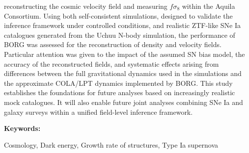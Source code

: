 reconstructing the cosmic velocity field and measuring $f\sigma_8$ within the Aquila Consortium. Using both self-consistent simulations, designed to validate the inference framework 
under controlled conditions, and realistic ZTF-like SNe Ia catalogues generated from the Uchuu N-body simulation, the performance of BORG was assessed for the reconstruction 
of density and velocity fields. Particular attention was given to the impact of the assumed SN bias model, the accuracy of the reconstructed fields, and systematic effects 
arising from differences between the full gravitational dynamics used in the simulations and the approximate COLA/LPT dynamics implemented by BORG. This study establishes 
the foundations for future analyses based on increasingly realistic mock catalogues. It will also enable future joint analyses combining SNe Ia and galaxy surveys within a 
unified field-level inference framework.


{\bfseries Keywords:}

Cosmology, Dark energy, Growth rate of structures, Type Ia supernova